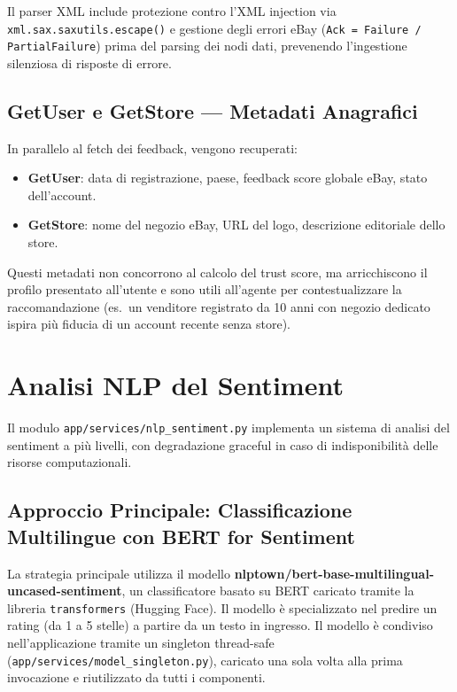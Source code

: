 Il parser XML include protezione contro l'XML injection via
\texttt{xml.sax.saxutils.escape()} e gestione degli errori eBay
(\texttt{Ack = Failure / PartialFailure}) prima del parsing dei nodi
dati, prevenendo l'ingestione silenziosa di risposte di errore.

\subsection{GetUser e GetStore — Metadati Anagrafici}
\label{subsec:seller-meta}

In parallelo al fetch dei feedback, vengono recuperati:

\begin{itemize}
    \item \textbf{GetUser}: data di registrazione, paese, feedback
        score globale eBay, stato dell'account.
    \item \textbf{GetStore}: nome del negozio eBay, URL del logo,
        descrizione editoriale dello store.
\end{itemize}

Questi metadati non concorrono al calcolo del trust score, ma
arricchiscono il profilo presentato all'utente e sono utili
all'agente per contestualizzare la raccomandazione (es.\ un venditore
registrato da 10 anni con negozio dedicato ispira più fiducia di un
account recente senza store).


\section{Analisi NLP del Sentiment}
\label{sec:seller-sentiment}

Il modulo \texttt{app/services/nlp\_sentiment.py} implementa un sistema
di analisi del sentiment a più livelli, con degradazione graceful
in caso di indisponibilità delle risorse computazionali.

\subsection{Approccio Principale: Classificazione Multilingue con BERT for Sentiment}
\label{subsec:sentiment-bert}

La strategia principale utilizza il modello
\textbf{nlptown/bert-base-multilingual-uncased-sentiment}, un classificatore
basato su BERT caricato tramite la libreria \texttt{transformers} (Hugging Face).
Il modello è specializzato nel predire un rating (da 1 a 5 stelle) a partire da
un testo in ingresso.
Il modello è condiviso nell'applicazione tramite un singleton thread-safe
(\texttt{app/services/model\_singleton.py}), caricato una sola volta
alla prima invocazione e riutilizzato da tutti i componenti.

